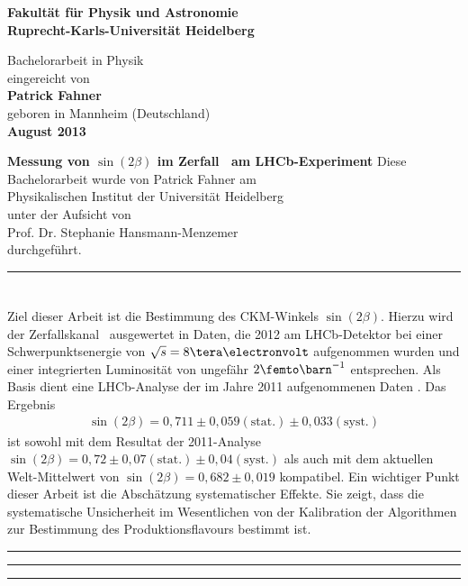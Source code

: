 \begin{titlepage}
\thispagestyle{empty}
\begin{center}
 
\Large\textbf{Fakultät für Physik und Astronomie\\
Ruprecht-Karls-Universität Heidelberg}

\vfill
\normalsize
Bachelorarbeit in Physik\\
eingereicht von\\
\vspace{0.5cm}
\Large\textbf{Patrick Fahner}\\
\normalsize
\vspace{0.5cm}
geboren in Mannheim (Deutschland)\\
\vspace{0.5cm}
\Large\textbf{August 2013}

\newpage
\thispagestyle{empty}
\cleardoublepage
\thispagestyle{empty}
\normalsize
\boldmath
\Huge{\textbf{Messung von $\sin(2\beta)$ im Zerfall \Decaychannel\ am LHCb-Experiment}}
\unboldmath
\vfill
\normalsize
Diese Bachelorarbeit wurde von Patrick Fahner am\\
Physikalischen Institut der Universität Heidelberg\\
unter der Aufsicht von\\
Prof. Dr. Stephanie Hansmann-Menzemer \\
durchgeführt.
\end{center}
\end{titlepage}
\newpage
\hrule
\section*{\abstractname}
Ziel dieser Arbeit ist die Bestimmung des CKM-Winkels $\sin(2\beta)$. Hierzu wird der Zerfallskanal \Decaychannel\ ausgewertet in Daten, die 2012 am LHCb-Detektor bei einer Schwerpunktsenergie von $\sqrt{s}=8\tera\electronvolt$ aufgenommen wurden und einer integrierten Luminosität von ungefähr $2\femto\barn^{-1}$ entsprechen. Als Basis dient eine LHCb-Analyse der im Jahre 2011 aufgenommenen Daten \cite{lhcb-paper}. Das Ergebnis 
\begin{align*}
\sin(2\beta) = 0,711 \pm 0,059(\text{stat.}) \pm 0,033(\text{syst.})
\end{align*}
ist sowohl mit dem Resultat der 2011-Analyse $\sin(2\beta) = 0,72 \pm 0,07 (\text{stat.}) \pm 0,04 (\text{syst.})$ \cite{lhcb-paper} als auch mit dem aktuellen Welt-Mittelwert von $\sin(2\beta) = 0,682 \pm 0,019$ \cite{pdg-average} kompatibel. Ein wichtiger Punkt dieser Arbeit ist die Abschätzung systematischer Effekte. Sie zeigt, dass die systematische Unsicherheit im Wesentlichen von der Kalibration der Algorithmen zur Bestimmung des Produktionsflavours bestimmt ist. \\
\hrule
\vfill
\hrule
{}
\hrule
\ZifferPunktAus
